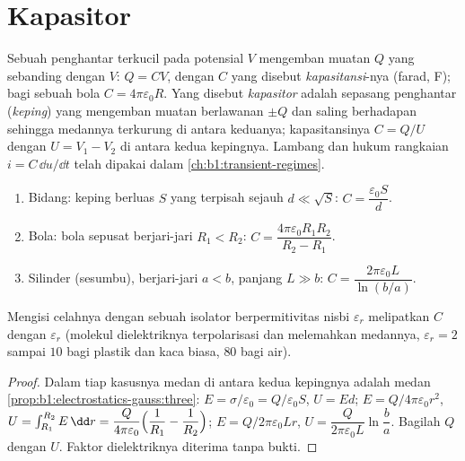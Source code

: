 \section{Kapasitor}

\begin{definition}[Kapasitansi]\label{def:b1:potential-capacitors:capacitance}
Sebuah penghantar terkucil pada potensial $V$ mengemban muatan $Q$
yang sebanding dengan $V$: $Q = CV$, dengan $C$ yang disebut
\emph{kapasitansi}-nya (farad, \unit{F}); bagi sebuah bola $C = 4\pi\varepsilon_0R$.
Yang disebut \emph{kapasitor} adalah sepasang penghantar (\emph{keping}) yang
mengemban muatan berlawanan $\pm Q$ dan saling berhadapan sehingga medannya
terkurung di antara keduanya; kapasitansinya $C = Q/U$ dengan $U = V_1 - V_2$
 di antara kedua kepingnya. Lambang dan hukum rangkaian $i = C\,\dd u/\dd t$
telah dipakai dalam \cref{ch:b1:transient-regimes}.
\end{definition}

\begin{proposition}\label{prop:b1:potential-capacitors:three}
\begin{enumerate}
  \item Bidang: keping berluas $S$ yang terpisah sejauh $d \ll \sqrt S$:
        $C = \dfrac{\varepsilon_0S}{d}$.
  \item Bola: bola sepusat berjari-jari $R_1 < R_2$:
        $C = \dfrac{4\pi\varepsilon_0R_1R_2}{R_2 - R_1}$.
  \item Silinder (sesumbu), berjari-jari $a < b$, panjang $L \gg b$:
        $C = \dfrac{2\pi\varepsilon_0L}{\ln(b/a)}$.
\end{enumerate}
Mengisi celahnya dengan sebuah isolator berpermitivitas nisbi
$\varepsilon_r$ melipatkan $C$ dengan $\varepsilon_r$ (molekul dielektriknya
terpolarisasi dan melemahkan medannya, $\varepsilon_r = 2$ sampai $10$ bagi
plastik dan kaca biasa, $80$ bagi air).
\end{proposition}

\begin{proof}
Dalam tiap kasusnya medan di antara kedua kepingnya adalah medan
\cref{prop:b1:electrostatics-gauss:three}: $E = \sigma/\varepsilon_0 = Q/\varepsilon_0S$,
$U = Ed$; $E = Q/4\pi\varepsilon_0r^2$, $U = \int_{R_1}^{R_2}E\,\dd r = \dfrac{Q}{4\pi\varepsilon_0}
\Bigl(\dfrac1{R_1} - \dfrac1{R_2}\Bigr)$; $E = Q/2\pi\varepsilon_0Lr$, $U =
\dfrac{Q}{2\pi\varepsilon_0L}\ln\dfrac ba$. Bagilah $Q$ dengan $U$. Faktor
dielektriknya diterima tanpa bukti.
\end{proof}

